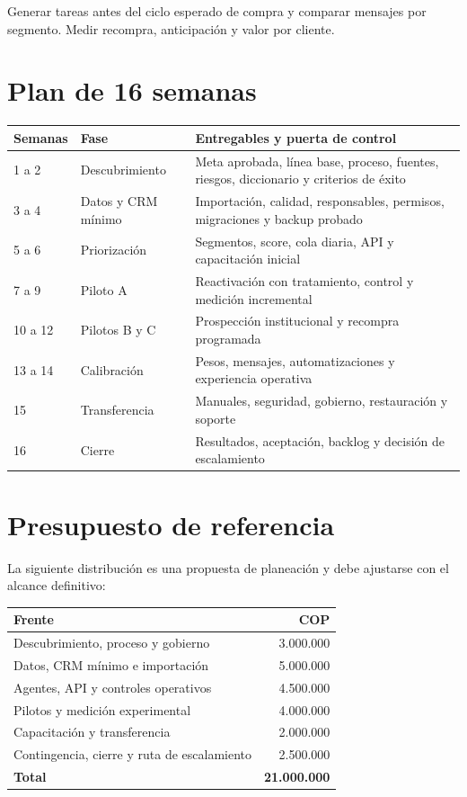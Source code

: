 \documentclass[11pt,a4paper]{article}
\begin{document}
Generar tareas antes del ciclo esperado de compra y comparar mensajes por
segmento. Medir recompra, anticipación y valor por cliente.

\section{Plan de 16 semanas}

\begin{longtable}{p{2cm}p{4.5cm}p{8cm}}
\toprule
\textbf{Semanas} & \textbf{Fase} & \textbf{Entregables y puerta de control}\\
\midrule
\endhead
1 a 2 & Descubrimiento & Meta aprobada, línea base, proceso, fuentes, riesgos,
diccionario y criterios de éxito\\
3 a 4 & Datos y CRM mínimo & Importación, calidad, responsables, permisos,
migraciones y backup probado\\
5 a 6 & Priorización & Segmentos, score, cola diaria, API y capacitación inicial\\
7 a 9 & Piloto A & Reactivación con tratamiento, control y medición incremental\\
10 a 12 & Pilotos B y C & Prospección institucional y recompra programada\\
13 a 14 & Calibración & Pesos, mensajes, automatizaciones y experiencia operativa\\
15 & Transferencia & Manuales, seguridad, gobierno, restauración y soporte\\
16 & Cierre & Resultados, aceptación, backlog y decisión de escalamiento\\
\bottomrule
\end{longtable}

\section{Presupuesto de referencia}

La siguiente distribución es una propuesta de planeación y debe ajustarse con el
alcance definitivo:

\begin{center}
\begin{tabularx}{0.92\textwidth}{Xr}
\toprule
\textbf{Frente} & \textbf{COP}\\
\midrule
Descubrimiento, proceso y gobierno & 3.000.000\\
Datos, CRM mínimo e importación & 5.000.000\\
Agentes, API y controles operativos & 4.500.000\\
Pilotos y medición experimental & 4.000.000\\
Capacitación y transferencia & 2.000.000\\
Contingencia, cierre y ruta de escalamiento & 2.500.000\\
\midrule
\textbf{Total} & \textbf{21.000.000}\\
\bottomrule
\end{tabularx}
\end{center}
\end{document}
